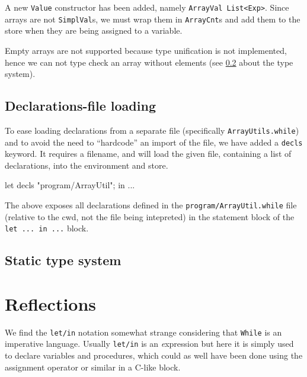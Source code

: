 \documentclass{article}
\begin{document}
A new {\tt Value} constructor has been added, namely {\tt ArrayVal List<Exp>}. Since arrays are not {\tt SimplVal}s, we must wrap them in {\tt ArrayCnt}s and add them to the store when they are being assigned to a variable.

Empty arrays are not supported because type unification is not implemented, hence we can not type check an array without elements (see \ref{sec:type} about the type system).

\subsection{Declarations-file loading}

To ease loading declarations from a separate file (specifically {\tt ArrayUtils.while}) and to avoid the need to ``hardcode'' an import of the file, we have added a {\tt decls} keyword. It requires a filename, and will load the given file, containing a list of declarations, into the environment and store.

\begin{fs}
let decls "program/ArrayUtil"; in ...
\end{fs}

The above exposes all declarations defined in the {\tt program/ArrayUtil.while} file (relative to the cwd, not the file being intepreted) in the statement block of the {\tt let ... in ...} block.

\subsection{Static type system}
\label{sec:type}


\section{Reflections}
We find the {\tt let/in} notation somewhat strange considering that {\tt While} is an imperative language. Usually {\tt let/in} is an {\textit expression} but here it is simply used to declare variables and procedures, which could as well have been done using the assignment operator or similar in a C-like block.
\end{document}
